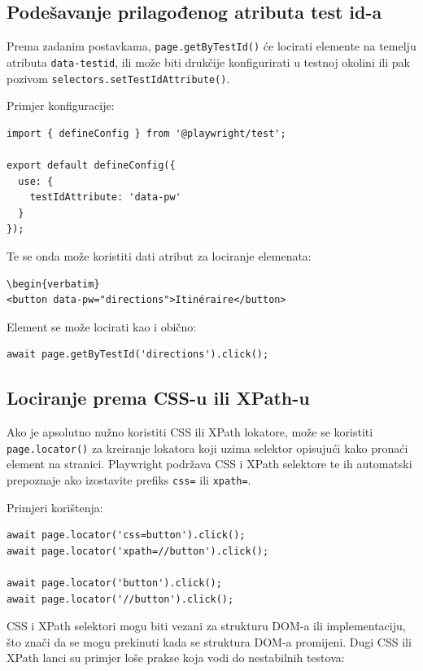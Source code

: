 \subsection*{Podešavanje prilagođenog atributa test id-a}

Prema zadanim postavkama, \texttt{page.getByTestId()} će locirati elemente na temelju atributa \texttt{data-testid}, ili može biti drukčije konfigurirati u testnoj okolini ili pak pozivom \texttt{selectors.setTestIdAttribute()}.

Primjer konfiguracije:

\begin{verbatim}
import { defineConfig } from '@playwright/test';

export default defineConfig({
  use: {
    testIdAttribute: 'data-pw'
  }
});
\end{verbatim}

Te se onda može koristiti dati atribut za lociranje elemenata:

\begin{verbatim}
\begin{verbatim}
<button data-pw="directions">Itinéraire</button>
\end{verbatim}

Element se može locirati kao i obično:

\begin{verbatim}
await page.getByTestId('directions').click();
\end{verbatim}

\subsection*{Lociranje prema CSS-u ili XPath-u}

Ako je apsolutno nužno koristiti CSS ili XPath lokatore, može se koristiti \texttt{page.locator()} za kreiranje lokatora koji uzima selektor opisujući kako pronaći element na stranici.
Playwright podržava CSS i XPath selektore te ih automatski prepoznaje ako izostavite prefiks \texttt{css=} ili \texttt{xpath=}.

Primjeri korištenja:

\begin{verbatim}
await page.locator('css=button').click();
await page.locator('xpath=//button').click();

await page.locator('button').click();
await page.locator('//button').click();
\end{verbatim}

CSS i XPath selektori mogu biti vezani za strukturu DOM-a ili implementaciju, što znači da se mogu prekinuti kada se struktura DOM-a promijeni.
Dugi CSS ili XPath lanci su primjer loše prakse koja vodi do nestabilnih testova:

